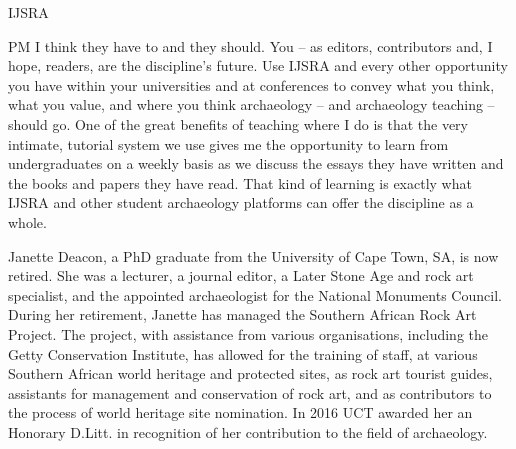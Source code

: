 \begin{labeling}{IJSRA}
\item[PM]I think they have to and they should. You – as editors, contributors and, I hope, readers, are the discipline’s future. Use IJSRA and every other opportunity you have within your universities and at conferences to convey what you think, what you value, and where you think archaeology – and archaeology teaching – should go. One of the great benefits of teaching where I do is that the very intimate, tutorial system we use gives me the opportunity to learn from undergraduates on a weekly basis as we discuss the essays they have written and the books and papers they have read. That kind of learning is exactly what IJSRA and other student archaeology platforms can offer the discipline as a whole.
\end{labeling}
\IJSRAseparator
{}
{\sffamily Janette Deacon, a PhD graduate from the University of Cape Town, SA, is now retired. She was a lecturer, a journal editor, a Later Stone Age and rock art specialist, and the appointed archaeologist for the National Monuments Council. During her retirement, Janette has managed the Southern African Rock Art Project. The project, with assistance from various organisations, including the Getty Conservation Institute, has allowed for the training of  staff, at various Southern African world heritage and protected sites, as rock art tourist guides, assistants for management and conservation of rock art, and as contributors to the process of world heritage site nomination. In 2016 UCT awarded her an Honorary D.Litt. in recognition of her contribution to the field of archaeology.}
